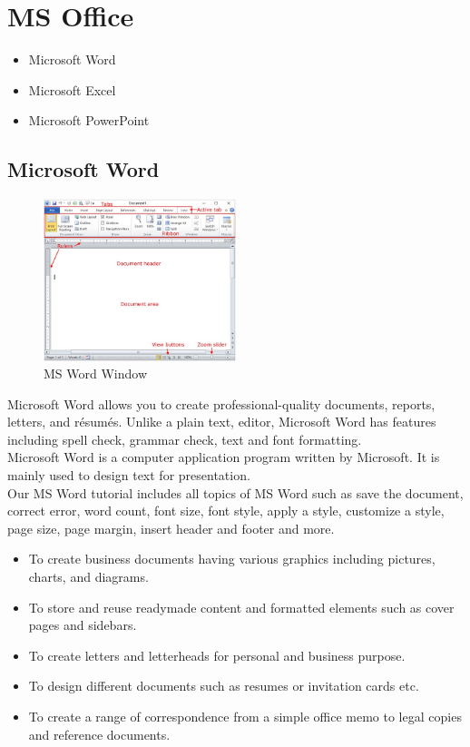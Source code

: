 \documentclass[11pt,a4paper,twoside]{article}
\begin{document}
\section{MS Office}
\begin{itemize}
    \item Microsoft Word
\item Microsoft Excel
\item Microsoft PowerPoint
\end{itemize}
\subsection{Microsoft Word}
\begin{figure}[H]
\centering \includegraphics[width=0.5\textwidth]{Fig 23.jpg}
\caption{MS Word Window}
\end{figure}
Microsoft Word allows you to create professional-quality documents, reports, letters, and résumés. Unlike a plain text, editor, Microsoft Word has features including spell check, grammar check, text and font formatting.\\
Microsoft Word is a computer application program written by Microsoft. It is mainly used to design text for presentation.\\
Our MS Word tutorial includes all topics of MS Word such as save the document, correct error, word count, font size, font style, apply a style, customize a style, page size, page margin, insert header and footer and more.
\begin{itemize}
    \item To create business documents having various graphics including pictures, charts, and diagrams.
\item To store and reuse readymade content and formatted elements such as cover pages and sidebars.
\item To create letters and letterheads for personal and business purpose.
\item To design different documents such as resumes or invitation cards etc.
\item To create a range of correspondence from a simple office memo to legal copies and reference documents.
\end{itemize}
\end{document}
